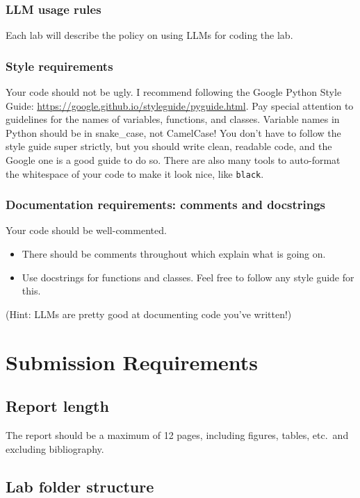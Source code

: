 \documentclass[letterpaper,12pt]{article}
\begin{document}
\subsubsection{LLM usage rules}
Each lab will describe the policy on using LLMs for coding the lab.

\subsubsection{Style requirements}
Your code should not be ugly. I recommend following the Google Python Style Guide: \url{https://google.github.io/styleguide/pyguide.html}. Pay special attention to guidelines for the names of variables, functions, and classes. Variable names in Python should be in snake\_case, not CamelCase! You don't have to follow the style guide super strictly, but you should write clean, readable code, and the Google one is a good guide to do so. There are also many tools to auto-format the whitespace of your code to make it look nice, like \texttt{black}.

\subsubsection{Documentation requirements: comments and docstrings}
Your code should be well-commented.
\begin{itemize}
  \item There should be comments throughout which explain what is going on.
  \item Use docstrings for functions and classes. Feel free to follow any style guide for this.
\end{itemize}
(Hint: LLMs are pretty good at documenting code you've written!)

\section{Submission Requirements}

\subsection{Report length}
The report should be a maximum of 12 pages, including figures, tables, etc.~and excluding bibliography.

\subsection{Lab folder structure}
\end{document}
